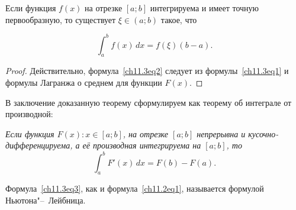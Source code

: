 \begin{cons}
Если функция $f(x)$ на отрезке $[a;b]$ интегрируема и имеет точную первообразную, то существует $\xi \in (a;b)$ такое, что

\begin{equation} \label{ch11.3eq2}
\int_{a}^{b}f(x) \,dx = f(\xi) (b - a).
\end{equation}

\end{cons}
\begin{proof}
Действительно, формула~\eqref{ch11.3eq2} следует из формулы~\eqref{ch11.3eq1} и формулы Лагранжа о среднем для функции $F(x)$.
\end{proof}

В заключение доказанную теорему сформулируем как теорему об интеграле от производной:

\textit{Если функция $F(x)\colon x \in [a;b]$, на отрезке $[a;b]$ непрерывна и кусочно-дифференцируема, а её производная интегрируема на $[a;b]$, то}
\begin{equation} \label{ch11.3eq3}
\int_{a}^{b}F'(x) \,dx = F(b) - F(a).
\end{equation} 

Формула~\eqref{ch11.3eq3}, как и формула~\eqref{ch11.2eq1}, называется формулой Ньютона"--~Лейбница.